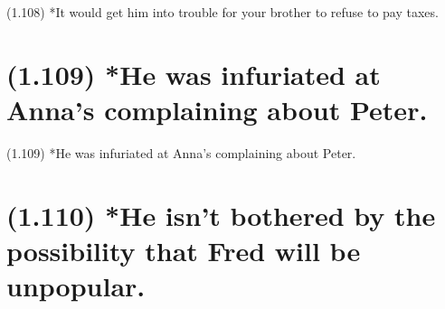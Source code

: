 \documentclass{article}
\begin{document}
\bigbreak
\begin{enumerate*}
\item[(1.108)] *It would get him into trouble for your brother to refuse to pay taxes.
\end{enumerate*}
\bigbreak

\bigbreak
\begin{minipage}{\textwidth}
\end{minipage}
\bigbreak

\clearpage

%
%

\section*{(1.109) *He was infuriated at Anna's complaining about Peter.}

\bigbreak
\begin{enumerate*}
\item[(1.109)] *He was infuriated at Anna's complaining about Peter.
\end{enumerate*}
\bigbreak

\bigbreak
\begin{minipage}{\textwidth}
\end{minipage}
\bigbreak

\clearpage

%
%

\section*{(1.110) *He isn't bothered by the possibility that Fred will be unpopular.}
\end{document}

